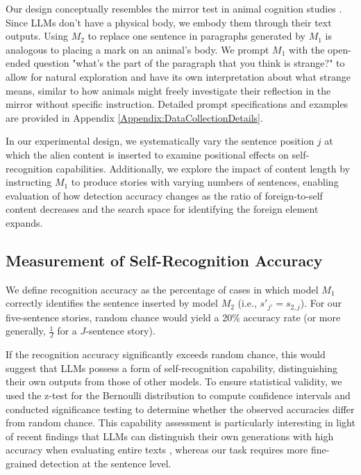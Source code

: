 \documentclass{article}
\begin{document}
Our design conceptually resembles the mirror test in animal cognition studies \citep{bekoff2023smart, nature2015mirror, rochat2023developmental}. Since LLMs don't have a physical body, we embody them through their text outputs. Using $M_2$ to replace one sentence in paragraphs generated by $M_1$ is analogous to placing a mark on an animal's body. We prompt $M_1$ with the open-ended question "what's the part of the paragraph that you think is strange?" to allow for natural exploration and have its own interpretation about what strange means, similar to how animals might freely investigate their reflection in the mirror without specific instruction. Detailed prompt specifications and examples are provided in Appendix \ref{Appendix:DataCollectionDetails}.
 

In our experimental design, we systematically vary the sentence position $j$ at which the alien content is inserted to examine positional effects on self-recognition capabilities. Additionally, we explore the impact of content length by instructing $M_1$ to produce stories with varying numbers of sentences, enabling evaluation of how detection accuracy changes as the ratio of foreign-to-self content decreases and the search space for identifying the foreign element expands.



\subsection{Measurement of Self-Recognition Accuracy}

We define recognition accuracy as the percentage of cases in which model $M_1$ correctly identifies the sentence inserted by model $M_2$ (i.e., $s'_{j'} = s_{2,j}$). For our five-sentence stories, random chance would yield a 20\% accuracy rate (or more generally, $\frac{1}{J}$ for a $J$-sentence story). 

If the recognition accuracy significantly exceeds random chance, this would suggest that LLMs possess a form of self-recognition capability, distinguishing their own outputs from those of other models. To ensure statistical validity, we used the z-test for the Bernoulli distribution to compute confidence intervals and conducted significance testing to determine whether the observed accuracies differ from random chance. This capability assessment is particularly interesting in light of recent findings that LLMs can distinguish their own generations with high accuracy when evaluating entire texts \citep{panickssery2024llm}, whereas our task requires more fine-grained detection at the sentence level.
\end{document}
